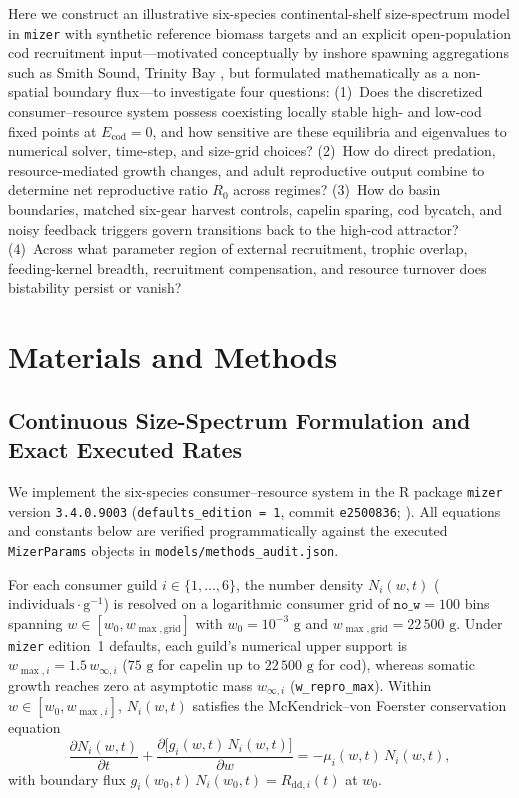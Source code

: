 \documentclass[11pt,letterpaper]{article}
\begin{document}
Here we construct an illustrative six-species continental-shelf size-spectrum model in \texttt{mizer} \citep{scott2014mizer,mizer2026package} with synthetic reference biomass targets and an explicit open-population cod recruitment input---motivated conceptually by inshore spawning aggregations such as Smith Sound, Trinity Bay \citep{rose2003monitoring,rose2011isolation}, but formulated mathematically as a non-spatial boundary flux---to investigate four questions: (1)~Does the discretized consumer--resource system possess coexisting locally stable high- and low-cod fixed points at $E_{\mathrm{cod}} = 0$, and how sensitive are these equilibria and eigenvalues to numerical solver, time-step, and size-grid choices? (2)~How do direct predation, resource-mediated growth changes, and adult reproductive output combine to determine net reproductive ratio $R_0$ across regimes? (3)~How do basin boundaries, matched six-gear harvest controls, capelin sparing, cod bycatch, and noisy feedback triggers govern transitions back to the high-cod attractor? (4)~Across what parameter region of external recruitment, trophic overlap, feeding-kernel breadth, recruitment compensation, and resource turnover does bistability persist or vanish?

\section{Materials and Methods}

\subsection{Continuous Size-Spectrum Formulation and Exact Executed Rates}

We implement the six-species consumer--resource system in the R package \texttt{mizer} version \texttt{3.4.0.9003} (\texttt{defaults\_edition = 1}, commit \texttt{e2500836}; \citealt{scott2014mizer,andersen2019fish,mizer2026package}). All equations and constants below are verified programmatically against the executed \texttt{MizerParams} objects in \texttt{models/\allowbreak methods\_audit.json}.

For each consumer guild $i \in \{1,\dots,6\}$, the number density $N_i(w,t)$ ($\text{individuals}\cdot\text{g}^{-1}$) is resolved on a logarithmic consumer grid of $\texttt{no\_w} = 100$ bins spanning $w \in [w_0, w_{\max,\mathrm{grid}}]$ with $w_0 = 10^{-3}\text{ g}$ and $w_{\max,\mathrm{grid}} = 22\,500\text{ g}$. Under \texttt{mizer} edition~1 defaults, each guild's numerical upper support is $w_{\max,i} = 1.5\, w_{\infty,i}$ ($75\text{ g}$ for capelin up to $22\,500\text{ g}$ for cod), whereas somatic growth reaches zero at asymptotic mass $w_{\infty,i}$ (\texttt{w\_repro\_max}). Within $w \in [w_0, w_{\max,i}]$, $N_i(w,t)$ satisfies the McKendrick--von Foerster conservation equation
\begin{equation}
  \frac{\partial N_i(w,t)}{\partial t} + \frac{\partial \big[g_i(w,t)\,N_i(w,t)\big]}{\partial w} = -\mu_i(w,t)\,N_i(w,t),
  \label{eq:mvf}
\end{equation}
with boundary flux $g_i(w_0,t)\,N_i(w_0,t) = R_{\mathrm{dd},i}(t)$ at $w_0$.
\end{document}
